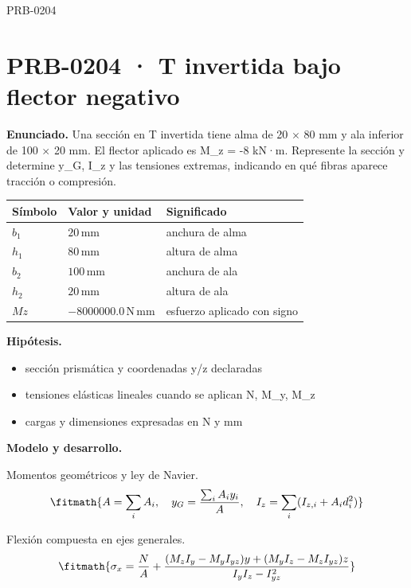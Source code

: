 \begin{studiumworked}{PRB-0204}

\section{PRB-0204 · T invertida bajo flector negativo}

\textbf{Enunciado.} Una sección en T invertida tiene alma de 20 \ensuremath{\times} 80 mm y ala inferior de 100 \ensuremath{\times} 20 mm. El flector aplicado es M\_z = -8 kN·m. Represente la sección y determine y\_G, I\_z y las tensiones extremas, indicando en qué fibras aparece tracción o compresión.

\par\medskip\noindent\begin{tabular}{@{}p{.18\linewidth}p{.26\linewidth}p{.48\linewidth}@{}}
\toprule Símbolo & Valor y unidad & Significado\\\midrule
$b_{1}$ & $20\,\mathrm{mm}$ & anchura de alma\\
$h_{1}$ & $80\,\mathrm{mm}$ & altura de alma\\
$b_{2}$ & $100\,\mathrm{mm}$ & anchura de ala\\
$h_{2}$ & $20\,\mathrm{mm}$ & altura de ala\\
$Mz$ & $-8000000.0\,\mathrm{N\,mm}$ & esfuerzo aplicado con signo\\
\bottomrule\end{tabular}\par\medskip

\textbf{Hipótesis.}\begin{itemize}\item sección prismática y coordenadas y/z declaradas
\item tensiones elásticas lineales cuando se aplican N, M\_y, M\_z
\item cargas y dimensiones expresadas en N y mm\end{itemize}

\textbf{Modelo y desarrollo.}

Momentos geométricos y ley de Navier.\[\fitmath{A = \sum_i A_i,\quad y_G = \frac{\sum_i A_i y_i}{A},\quad I_z = \sum_i (I_{z,i}+A_i d_i^2)}\]

Flexión compuesta en ejes generales.\[\fitmath{\sigma_x = \frac{N}{A}+\frac{(M_z I_y-M_y I_{yz})y+(M_y I_z-M_z I_{yz})z}{I_y I_z-I_{yz}^{2}}}\]


\end{studiumworked}

